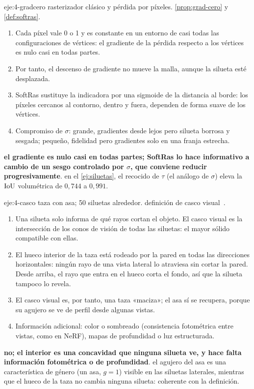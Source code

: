 \begin{solucion}{eje:4-gradcero}
\datos rasterizador clásico y pérdida por píxeles.
\planteamiento \cref{prop:grad-cero} y \cref{def:softras}.
\pasos
\begin{enumerate}[label=\arabic*.]
  \item Cada píxel vale 0 o 1 y es constante en un entorno de casi todas las configuraciones de vértices: el gradiente de la pérdida respecto a los vértices es nulo casi en todas partes.
  \item Por tanto, el descenso de gradiente no mueve la malla, aunque la silueta esté desplazada.
  \item SoftRas sustituye la indicadora por una sigmoide de la distancia al borde: los píxeles cercanos al contorno, dentro y fuera, dependen de forma suave de los vértices.
  \item Compromiso de $\sigma$: grande, gradientes desde lejos pero silueta borrosa y sesgada; pequeño, fidelidad pero gradientes solo en una franja estrecha.
\end{enumerate}
\resultado \textbf{el gradiente es nulo casi en todas partes; SoftRas lo hace informativo a cambio de un sesgo controlado por $\sigma$, que conviene reducir progresivamente}.
\comprobacion en el \cref{ej:siluetas}, el recocido de $\tau$ (el análogo de $\sigma$) eleva la $\operatorname{IoU}$ volumétrica de $0{,}744$ a $0{,}991$.
\end{solucion}

\begin{solucion}{eje:4-casco}
\datos taza con asa; 50 siluetas alrededor.
\planteamiento definición de casco visual~\cite{laurentini}.
\pasos
\begin{enumerate}[label=\arabic*.]
  \item Una silueta solo informa de qué rayos cortan el objeto. El casco visual es la intersección de los conos de visión de todas las siluetas: el mayor sólido compatible con ellas.
  \item El hueco interior de la taza está rodeado por la pared en todas las direcciones horizontales: ningún rayo de una vista lateral lo atraviesa sin cortar la pared. Desde arriba, el rayo que entra en el hueco corta el fondo, así que la silueta tampoco lo revela.
  \item El casco visual es, por tanto, una taza «maciza»; el asa sí se recupera, porque su agujero se ve de perfil desde algunas vistas.
  \item Información adicional: color o sombreado (consistencia fotométrica entre vistas, como en NeRF), mapas de profundidad o luz estructurada.
\end{enumerate}
\resultado \textbf{no; el interior es una concavidad que ninguna silueta ve, y hace falta información fotométrica o de profundidad}.
\comprobacion el agujero del asa es una característica de género (un asa, $g=1$) visible en las siluetas laterales, mientras que el hueco de la taza no cambia ninguna silueta: coherente con la definición.
\end{solucion}

